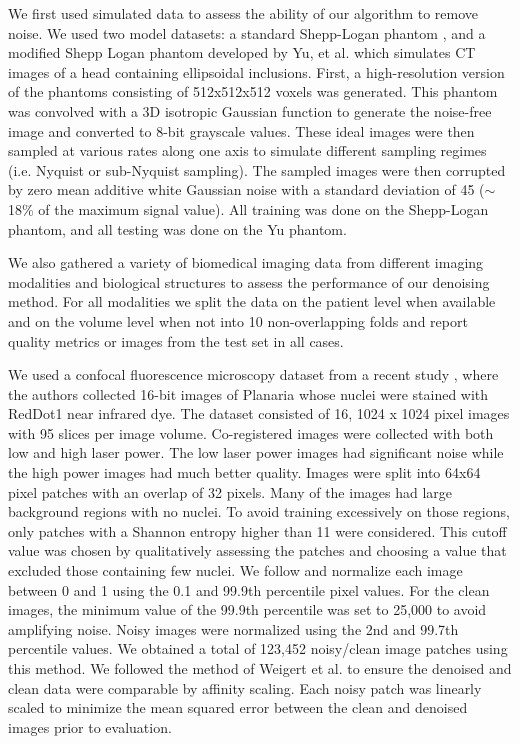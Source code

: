 \documentclass[journal,twoside,web]{ieeecolor}
\begin{document}
We first used simulated data to assess the ability of our algorithm to remove noise. We used two model datasets: a standard Shepp-Logan phantom \cite{Shepp1974}, and a modified Shepp Logan phantom developed by Yu, et al.\cite{Yu2004} which simulates CT images of a head containing ellipsoidal inclusions. First, a high-resolution version of the phantoms consisting of 512x512x512 voxels was generated. This phantom was convolved with a 3D isotropic Gaussian function to generate the noise-free image and converted to 8-bit grayscale values. These ideal images were then sampled at various rates along one axis to simulate different sampling regimes (i.e. Nyquist or sub-Nyquist sampling). The sampled images were then corrupted by zero mean additive white Gaussian noise with a standard deviation of 45 ($\sim$18\% of the maximum signal value). All training was done on the Shepp-Logan phantom, and all testing was done on the Yu phantom.

We also gathered a variety of biomedical imaging data from different imaging modalities and biological structures to assess the performance of our denoising method. For all modalities we split the data on the patient level when available and on the volume level when not into 10 non-overlapping folds and report quality metrics or images from the test set in all cases.

We used a confocal fluorescence microscopy dataset from a recent study \cite{Weigert2018b}, where the authors collected 16-bit images of Planaria whose nuclei were stained with RedDot1 near infrared dye. The dataset consisted of 16, 1024 x 1024 pixel images with 95 slices per image volume. Co-registered images were collected with both low and high laser power. The low laser power images had significant noise while the high power images had much better quality. Images were split into 64x64 pixel patches with an overlap of 32 pixels. Many of the images had large background regions with no nuclei. To avoid training excessively on those regions, only patches with a Shannon entropy higher than 11 were considered. This cutoff value was chosen by qualitatively assessing the patches and choosing a value that excluded those containing few nuclei. We follow \cite{Weigert2018b} and normalize each image between 0 and 1 using the 0.1 and 99.9th percentile pixel values. For the clean images, the minimum value of the 99.9th percentile was set to 25,000 to avoid amplifying noise. Noisy images were normalized using the 2nd and 99.7th percentile values. We obtained a total of 123,452 noisy/clean image patches using this method. We followed the method of Weigert et al.\cite{Weigert2018b} to ensure the denoised and clean data were comparable by affinity scaling. Each noisy patch was linearly scaled to minimize the mean squared error between the clean and denoised images prior to evaluation. 
\end{document}
